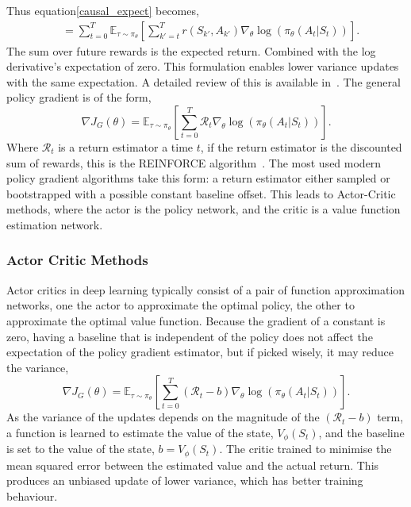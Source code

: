 Thus equation\ref{causal_expect} becomes,
\begin{align}
	 & = \sum_{t = 0} ^T \mathbb{E}_{\tau \sim \pi_\theta} \left [  \sum_{k' = t} ^T  r(S_{k'}, A_{k'}) \nabla_\theta \log(\pi_\theta(A_t| S_t)) \right ].
\end{align}
The sum over future rewards is the expected return. Combined with the log derivative's expectation of zero. This formulation enables lower variance updates with the same expectation. A detailed review of this is available in~\cite{schulman2015highdimensional}. The general policy gradient is of the form,
\begin{equation}
	\nabla J_G(\theta)  = \mathbb{E}_{\tau \sim \pi_\theta} \left[\sum_{t=0} ^ T \mathcal{R}_t \nabla_\theta \log(\pi_\theta(A_t|S_t))\right].
\end{equation}
Where $\mathcal{R}_t$ is a return estimator a time $t$, if the return estimator is the discounted sum of rewards, this is the REINFORCE algorithm~\cite{williams1992simple}.
The most used modern policy gradient algorithms take this form: a return estimator either sampled or bootstrapped with a possible constant baseline offset. This leads to Actor-Critic methods, where the actor is the policy network, and the critic is a value function estimation network.

\subsubsection{Actor Critic Methods}
Actor critics in deep learning typically consist of a pair of function approximation networks, one the actor to approximate the optimal policy, the other to approximate the optimal value function. Because the gradient of a constant is zero, having a baseline that is independent of the policy does not affect the expectation of the policy gradient estimator, but if picked wisely, it may reduce the variance,
\begin{equation}
	\nabla J_G(\theta)  = \mathbb{E}_{\tau \sim \pi_\theta} \left[\sum_{t=0} ^ T (\mathcal{R}_t - b) \nabla_\theta \log(\pi_\theta(A_t|S_t))\right].
\end{equation}
As the variance of the updates depends on the magnitude of the $(\mathcal{R}_t - b)$ term, a function is learned to estimate the value of the state, $V_\phi(S_t)$, and the baseline is set to the value of the state, $b = V_\phi(S_t)$. The critic trained to minimise the mean squared error between the estimated value and the actual return. This produces an unbiased update of lower variance, which has better training behaviour\cite{sutton2018reinforcement}.

